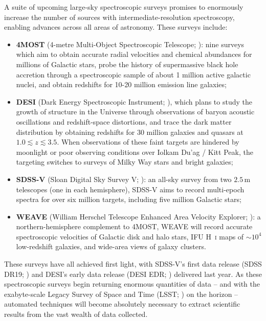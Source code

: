 \documentclass[fleqn,usenatbib]{mnras}
\begin{document}
A suite of upcoming large-sky spectroscopic surveys promises to enormously increase the number of sources with intermediate-resolution spectroscopy, enabling advances across all areas of astronomy.
These surveys include:
\begin{itemize}
\item
\textbf{4MOST}
(4-metre Multi-Object Spectroscopic Telescope; \citealt{4most}): nine surveys which aim to obtain accurate radial velocities and chemical abundances for millions of Galactic stars, probe the history of supermassive black hole accretion through a spectroscopic sample of about 1 million active galactic nuclei, and obtain redshifts for 10-20 million emission line galaxies;
\item
\textbf{DESI}
(Dark Energy Spectroscopic Instrument; \citealt{desii, desiii}), which plans to study the growth of structure in the Universe through observations of baryon acoustic oscillations and redshift-space distortions, and trace the dark matter distribution by obtaining redshifts for 30 million galaxies and quasars at $1.0\lesssim z \lesssim 3.5$.
When observations of these faint targets are hindered by moonlight or poor observing conditions over Iolkam Du'ag / Kitt Peak, the targeting switches to surveys of Milky Way stars and bright galaxies;
\item
\textbf{SDSS-V}
(Sloan Digital Sky Survey V; \citealt{sdssv}):
an all-sky survey from two $2.5\,\text{m}$ telescopes (one in each hemisphere), SDSS-V aims to record multi-epoch spectra for over six million targets, including five million Galactic stars;
\item
\textbf{WEAVE}
(William Herschel Telescope Enhanced Area Velocity Explorer; \citealt{weave}): a northern-hemisphere complement to 4MOST, WEAVE will record accurate spectroscopic velocities of Galactic disk and halo stars, IFU H~\textsc{i} maps of $\sim10^4$ low-redshift galaxies, and wide-area views of galaxy clusters.
\end{itemize}
These surveys have all achieved first light, with SDSS-V's first data release (SDSS DR19; \citealt{sdssdr19}) and DESI's early data release (DESI EDR; \citealt{desiedr}) delivered last year.
As these spectroscopic surveys begin returning enormous quantities of data -- and with the exabyte-scale Legacy Survey of Space and Time (LSST; \citealt{lsst}) on the horizon -- automated techniques will become absolutely necessary to extract scientific results from the vast wealth of data collected.
\end{document}

